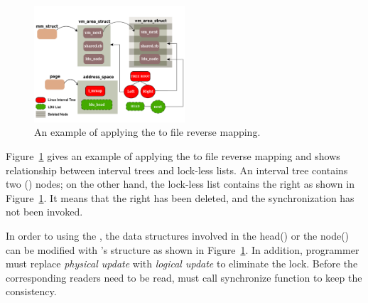 \begin{figure}[tb]
  \begin{center}
    \includegraphics[width=0.5\textwidth,height=0.5\textheight,keepaspectratio]{fig/deferu}
  \end{center}
  \caption{An example of applying the  to file reverse mapping. }
  \label{fig:deferu}
\end{figure}


Figure~\ref{fig:deferu} gives an example of applying the  to file
reverse mapping and shows relationship between interval trees and lock-less lists.
An interval tree contains two () nodes; 
on the other hand, the lock-less list contains the right  as shown in
Figure~\ref{fig:deferu}.
It means that the right  has been deleted, and the synchronization has
not been invoked. 

In order to using the , the data structures involved in the
head() or the node() can be modified
with 's structure as shown in Figure~\ref{fig:deferu}. 
In addition, programmer must replace \emph{physical update} with \emph{logical
update} to eliminate the lock. 
Before the corresponding readers need to be read,  must call synchronize
function to keep the consistency.
